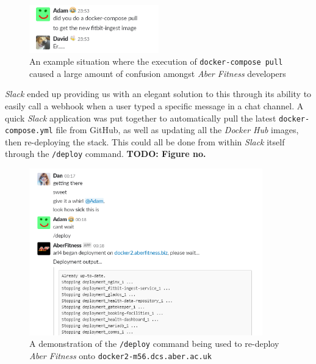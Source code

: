 \begin{figure}[H]
    \centering
    \includegraphics[width=0.5\textwidth]{Images/aberfitness_slack_bot_reason_why.png}
    \caption{An example situation where the execution of \lstinline{docker-compose pull} caused a large amount of confusion amongst \textit{Aber Fitness} developers}
\end{figure}


\textit{Slack} ended up providing us with an elegant solution to this through its ability to easily call a webhook when a user typed a specific message in a chat channel. A quick \textit{Slack} application was put together to automatically pull the latest \lstinline{docker-compose.yml} file from GitHub, as well as updating all the \textit{Docker Hub} images, then re-deploying the stack. This could all be done from within \textit{Slack} itself through the \lstinline{/deploy} command. \textbf{TODO: Figure no.}

\begin{figure}[H]
    \centering
    \includegraphics[width=0.9\textwidth]{Images/aberfitness_slack_bot.png}
    \caption{A demonstration of the \lstinline{/deploy} command being used to re-deploy \textit{Aber Fitness} onto \lstinline{docker2-m56.dcs.aber.ac.uk}}
\end{figure}

